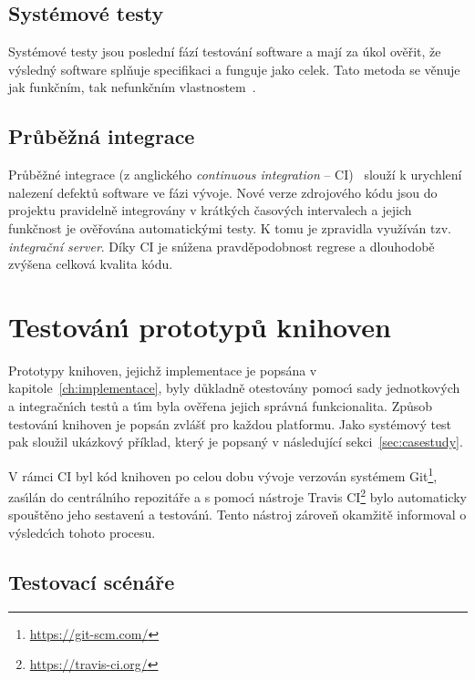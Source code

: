 \subsection{Systémové testy}

Systémové testy jsou poslední fází testování software a mají za úkol ověřit, že výsledný
software splňuje specifikaci a funguje jako celek. Tato metoda se věnuje jak funkčním,
tak nefunkčním vlastnostem~\cite{graham2008foundations}.

\subsection{Průběžná integrace}

Průběžné integrace (z anglického \textit{continuous integration} -- \gls{CI})~\cite{fowler2006continuous}
slouží k urychlení nalezení defektů software ve fázi vývoje. Nové verze zdrojového kódu jsou do projektu pravidelně
integrovány v krátkých časových intervalech a jejich funkčnost je ověřována automatickými testy. K tomu je
zpravidla využíván tzv. \textit{integrační server}. Díky \gls{CI} je sn\'{\i}žena pravděpodobnost regrese
a dlouhodobě zv\'yšena celková kvalita kódu.

\section{Testován\'{\i} prototypů knihoven}

Prototypy knihoven, jejichž implementace je popsána v kapitole~\ref{ch:implementace},
byly důkladně otestovány pomoc\'{\i} sady jednotkov\'ych a integračn\'{\i}ch
testů a t\'{\i}m byla ověřena jejich správná funkcionalita. Způsob
testován\'{\i} knihoven je popsán zvlášť pro každou platformu. Jako systémový test pak
sloužil ukázkový příklad, který je popsaný v následující sekci~\ref{sec:casestudy}.

V rámci \gls{CI} byl kód knihoven po celou dobu v\'yvoje verzován systémem
Git\footnote{\url{https://git-scm.com/}}, zas\'{\i}lán do centráln\'{\i}ho repozitáře a
s pomoc\'{\i} nástroje Travis \gls{CI}\footnote{\url{https://travis-ci.org/}}
bylo automaticky spouštěno jeho sestaven\'{\i} a testován\'{\i}.
Tento nástroj zároveň okamžitě informoval o v\'ysledc\'{\i}ch tohoto procesu.

\subsection{Testovací scénáře}

